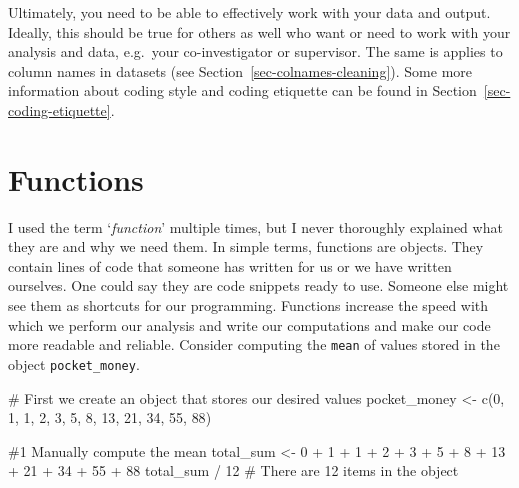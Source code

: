 \documentclass[
  letterpaper,
  DIV=11,
  numbers=noendperiod]{scrreprt}
\newenvironment{Shaded}{\begin{snugshade}}{\end{snugshade}}
\newcommand{\CommentTok}[1]{\textcolor[rgb]{0.37,0.37,0.37}{#1}}
\newcommand{\DecValTok}[1]{\textcolor[rgb]{0.68,0.00,0.00}{#1}}
\newcommand{\FunctionTok}[1]{\textcolor[rgb]{0.28,0.35,0.67}{#1}}
\newcommand{\NormalTok}[1]{\textcolor[rgb]{0.00,0.23,0.31}{#1}}
\newcommand{\OtherTok}[1]{\textcolor[rgb]{0.00,0.23,0.31}{#1}}
\newcommand{\SpecialCharTok}[1]{\textcolor[rgb]{0.37,0.37,0.37}{#1}}
\begin{document}
Ultimately, you need to be able to effectively work with your data and
output. Ideally, this should be true for others as well who want or need
to work with your analysis and data, e.g.~your co-investigator or
supervisor. The same is applies to column names in datasets (see
Section~\ref{sec-colnames-cleaning}). Some more information about coding
style and coding etiquette can be found in
Section~\ref{sec-coding-etiquette}.

\section{Functions}\label{sec-functions}

I used the term `\emph{function}' multiple times, but I never thoroughly
explained what they are and why we need them. In simple terms, functions
are objects. They contain lines of code that someone has written for us
or we have written ourselves. One could say they are code snippets ready
to use. Someone else might see them as shortcuts for our programming.
Functions increase the speed with which we perform our analysis and
write our computations and make our code more readable and reliable.
Consider computing the \texttt{mean} of values stored in the object
\texttt{pocket\_money}.

\begin{Shaded}
\begin{Highlighting}[]
\CommentTok{\# First we create an object that stores our desired values}
\NormalTok{pocket\_money }\OtherTok{\textless{}{-}} \FunctionTok{c}\NormalTok{(}\DecValTok{0}\NormalTok{, }\DecValTok{1}\NormalTok{, }\DecValTok{1}\NormalTok{, }\DecValTok{2}\NormalTok{, }\DecValTok{3}\NormalTok{, }\DecValTok{5}\NormalTok{, }\DecValTok{8}\NormalTok{, }\DecValTok{13}\NormalTok{, }\DecValTok{21}\NormalTok{, }\DecValTok{34}\NormalTok{, }\DecValTok{55}\NormalTok{, }\DecValTok{88}\NormalTok{)}

\CommentTok{\#1 Manually compute the mean}
\NormalTok{total\_sum }\OtherTok{\textless{}{-}} \DecValTok{0} \SpecialCharTok{+} \DecValTok{1} \SpecialCharTok{+} \DecValTok{1} \SpecialCharTok{+} \DecValTok{2} \SpecialCharTok{+} \DecValTok{3} \SpecialCharTok{+} \DecValTok{5} \SpecialCharTok{+} \DecValTok{8} \SpecialCharTok{+} \DecValTok{13} \SpecialCharTok{+} \DecValTok{21} \SpecialCharTok{+} \DecValTok{34} \SpecialCharTok{+} \DecValTok{55} \SpecialCharTok{+} \DecValTok{88}
\NormalTok{total\_sum }\SpecialCharTok{/} \DecValTok{12} \CommentTok{\# There are 12 items in the object}
\end{Highlighting}
\end{Shaded}
\end{document}
